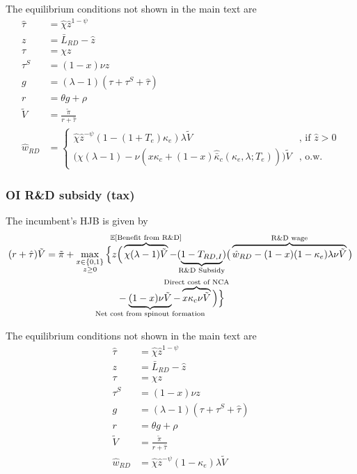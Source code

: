 \documentclass[11pt,english]{article}
\begin{document}
The equilibrium conditions not shown in the main text are
\begin{align}
\hat{\tau} &= \hat{\chi} \hat{z}^{1-\psi} \\
z &= \bar{L}_{RD} - \hat{z} \label{eq:labor_resource_constraint_entryTax}\\ 
\tau &= \chi z \\
\tau^S &= (1-x) \nu z \\
g &= (\lambda - 1) (\tau + \tau^S + \hat{\tau}) \\
r &= \theta g + \rho \\
\tilde{V} &= \frac{\tilde{\pi}}{r + \hat{\tau}} \\ 
\hat{w}_{RD} &= \begin{cases}
\hat{\chi} \hat{z}^{-\psi} (1-(1+T_e)\kappa_e) \lambda \tilde{V} &\textrm{, if } \hat{z} > 0\\
\Big( \chi(\lambda -1) - \nu (x\kappa_c + (1-x)\hat{\bar{\kappa}}_c(\kappa_e,\lambda;T_e))\Big) \tilde{V} &\textrm{, o.w.}
\end{cases} \label{eq:wage_rd_labor_entryTax}
\end{align}


\subsubsection{OI R\&D subsidy (tax)}\label{appendix:model:efficiencyderivations:OIRDtax}

The incumbent's HJB is given by
\begin{align}
(r + \hat{\tau}) \tilde{V} = \tilde{\pi} + \max_{\substack{x \in \{0,1\} \\ z \ge 0}} \Big\{z &\Big( \overbrace{\chi (\lambda - 1) \tilde{V}}^{\mathclap{\mathbb{E}[\textrm{Benefit from R\&D}]}}- (\underbrace{1-T_{RD,I}}_{\mathclap{\text{R\&D Subsidy}}}) \big( \overbrace{\hat{w}_{RD} - (1-x)(1-\kappa_e)\lambda \nu \tilde{V}}^{\mathclap{\text{R\&D wage}}}\big) \label{eq:hjb_incumbent_RDsubsidyTargeted} \nonumber \\ 
&-  \underbrace{(1-x) \nu \tilde{V}}_{\mathclap{\text{Net cost from spinout formation}}} - \overbrace{x \kappa_{c} \nu \tilde{V}}^{\mathclap{\text{Direct cost of NCA}}}\Big) \Big\} 
\end{align}

The equilibrium conditions not shown in the main text are
\begin{align}
\hat{\tau} &= \hat{\chi} \hat{z}^{1-\psi} \\
z &= \bar{L}_{RD} - \hat{z} \label{eq:labor_resource_constraint_RDsubsidyTargeted}\\ 
\tau &= \chi z \\
\tau^S &= (1-x) \nu z \\
g &= (\lambda - 1) (\tau + \tau^S + \hat{\tau}) \\
r &= \theta g + \rho \\
\tilde{V} &= \frac{\tilde{\pi}}{r + \hat{\tau}} \\ 
\hat{w}_{RD} &= \hat{\chi} \hat{z}^{-\psi} (1-\kappa_e) \lambda \tilde{V} \label{eq:wage_rd_labor_RDsubsidyTargeted}
\end{align}
\end{document}
